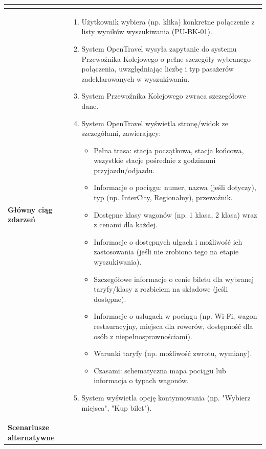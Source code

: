 \documentclass[a4paper,12pt]{article}
\begin{document}
\begin{longtable}{|p{\pierwszakolumnaszerokoscPUBKSzczegoly}|p{\drugakolumnaszerokoscPUBKSzczegoly}|}
\begin{itemize}
        \end{itemize} \\
    \hline
    \textbf{Główny ciąg zdarzeń} &
        \begin{enumerate} \itemsep0pt \parskip0pt \parsep0pt
            \item Użytkownik wybiera (np. klika) konkretne połączenie z listy wyników wyszukiwania (PU-BK-01).
            \item System OpenTravel wysyła zapytanie do systemu Przewoźnika Kolejowego o pełne szczegóły wybranego połączenia, uwzględniając liczbę i typ pasażerów zadeklarowanych w wyszukiwaniu.
            \item System Przewoźnika Kolejowego zwraca szczegółowe dane.
            \item System OpenTravel wyświetla stronę/widok ze szczegółami, zawierający:
                \begin{itemize} \itemsep0pt \parskip0pt \parsep0pt
                    \item Pełna trasa: stacja początkowa, stacja końcowa, wszystkie stacje pośrednie z godzinami przyjazdu/odjazdu.
                    \item Informacje o pociągu: numer, nazwa (jeśli dotyczy), typ (np. InterCity, Regionalny), przewoźnik.
                    \item Dostępne klasy wagonów (np. 1 klasa, 2 klasa) wraz z cenami dla każdej.
                    \item Informacje o dostępnych ulgach i możliwość ich zastosowania (jeśli nie zrobiono tego na etapie wyszukiwania).
                    \item Szczegółowe informacje o cenie biletu dla wybranej taryfy/klasy z rozbiciem na składowe (jeśli dostępne).
                    \item Informacje o usługach w pociągu (np. Wi-Fi, wagon restauracyjny, miejsca dla rowerów, dostępność dla osób z niepełnosprawnościami).
                    \item Warunki taryfy (np. możliwość zwrotu, wymiany).
                    \item Czasami: schematyczna mapa pociągu lub informacja o typach wagonów.
                \end{itemize}
            \item System wyświetla opcję kontynuowania (np. "Wybierz miejsca", "Kup bilet").
        \end{enumerate} \\
    \hline
    \textbf{Scenariusze alternatywne} &

\end{longtable}
\end{document}
